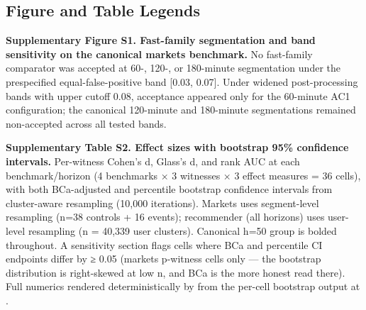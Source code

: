 \documentclass[
  11pt,
]{article}
\begin{document}
\subsection{Figure and Table Legends}\label{figure-and-table-legends}

\textbf{Supplementary Figure S1. Fast-family segmentation and band
sensitivity on the canonical markets benchmark.} No fast-family
comparator was accepted at 60-, 120-, or 180-minute segmentation under
the prespecified equal-false-positive band {[}0.03, 0.07{]}. Under
widened post-processing bands with upper cutoff 0.08, acceptance
appeared only for the 60-minute AC1 configuration; the canonical
120-minute and 180-minute segmentations remained non-accepted across all
tested bands.

\textbf{Supplementary Table S2. Effect sizes with bootstrap 95\%
confidence intervals.} Per-witness Cohen's d, Glass's d, and rank AUC at
each benchmark/horizon (4 benchmarks × 3 witnesses × 3 effect measures =
36 cells), with both BCa-adjusted and percentile bootstrap confidence
intervals from cluster-aware resampling (10,000 iterations). Markets
uses segment-level resampling (n=38 controls + 16 events); recommender
(all horizons) uses user-level resampling (n = 40,339 user clusters).
Canonical h=50 group is bolded throughout. A sensitivity section flags
cells where BCa and percentile CI endpoints differ by ≥ 0.05 (markets
p-witness cells only --- the bootstrap distribution is right-skewed at
low n, and BCa is the more honest read there). Full numerics rendered
deterministically by
\texttt{} from the
per-cell bootstrap output at
\texttt{}.
\end{document}
